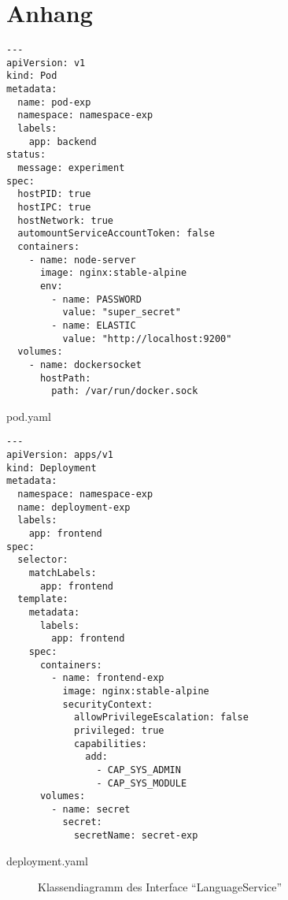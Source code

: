 \chapter{Anhang}\label{ch:appendix}

\begin{listing}[htp]
    \begin{verbatim}
---
apiVersion: v1
kind: Pod
metadata:
  name: pod-exp
  namespace: namespace-exp
  labels:
    app: backend  
status:
  message: experiment
spec: 
  hostPID: true
  hostIPC: true
  hostNetwork: true
  automountServiceAccountToken: false
  containers:
    - name: node-server
      image: nginx:stable-alpine
      env:
        - name: PASSWORD
          value: "super_secret"
        - name: ELASTIC
          value: "http://localhost:9200" 
  volumes:
    - name: dockersocket
      hostPath:
        path: /var/run/docker.sock
    \end{verbatim}
    \caption{pod.yaml}
    \label{lst:pod-yaml-file}
\end{listing}

\begin{listing}[htp]
    \begin{verbatim}
---
apiVersion: apps/v1
kind: Deployment
metadata:
  namespace: namespace-exp
  name: deployment-exp
  labels:
    app: frontend
spec:
  selector:
    matchLabels:
      app: frontend
  template:
    metadata:
      labels:
        app: frontend
    spec:
      containers:
        - name: frontend-exp
          image: nginx:stable-alpine
          securityContext:
            allowPrivilegeEscalation: false
            privileged: true
            capabilities:
              add:
                - CAP_SYS_ADMIN
                - CAP_SYS_MODULE
      volumes:
        - name: secret
          secret:
            secretName: secret-exp 
    \end{verbatim}
    \caption{deployment.yaml}
    \label{lst:deployment-yaml-file}
\end{listing}


\begin{figure}[htp] %
    \centering
    \caption{Klassendiagramm des Interface ``LanguageService''}
    \label{fig:language-service-interface-defition}
\end{figure}

\vspace{0.5cm}

